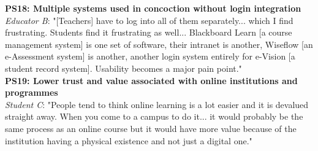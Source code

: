 \textbf{PS18: Multiple systems used in concoction without login integration}\\
\textit{Educator B}: "[Teachers] have to log into all of them separately... which I find frustrating. 
Students find it frustrating as well... Blackboard Learn [a course management system] is one set of 
software, their intranet is another, Wiseflow [an e-Assessment system] is another, another login system 
entirely for e-Vision [a student record system]. Usability becomes a major pain point."
\vspace{0.25cm}\\
\textbf{PS19: Lower trust and value associated with online institutions and programmes}\\
\textit{Student C}: "People tend to think online learning is a lot easier and it is devalued straight away. 
When you come to a campus to do it... it would probably be the same process as an online course but 
it would have more value because of the institution having a physical existence and not just a digital one."


